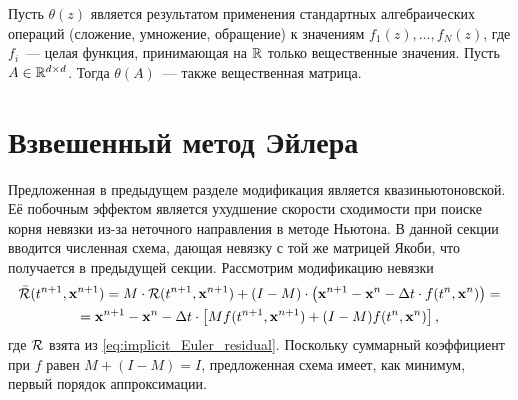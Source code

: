 \begin{corollary}
    \label{cor:real_matrix}
    Пусть $ \theta(z) $ является результатом применения стандартных алгебраических операций (сложение, умножение, обращение)
    к значениям $ f_1(z), \ldots, f_N(z) $, где $ f_i $~--- целая функция, принимающая на $ \mathbb{R} $ только вещественные значения.
    Пусть $ A \in \mathbb{R}^{d \times d} $.
    Тогда $ \theta(A) $~--- также вещественная матрица.
\end{corollary}



\section{Взвешенный метод Эйлера}
\label{sec:weighted_Euler}

Предложенная в предыдущем разделе модификация является квазиньютоновской.
Её побочным эффектом является ухудшение скорости сходимости при поиске корня невязки из-за неточного направления в методе Ньютона.
В данной секции вводится численная схема, дающая невязку с той же матрицей Якоби,
что получается в предыдущей секции.
Рассмотрим модификацию невязки
%
\begin{multline}
    \label{eq:modified_residual}
    \bar{\mathcal{R}}(t^{n+1}, \mathbf{x}^{n+1}) = M \cdot \mathcal{R}(t^{n+1}, \mathbf{x}^{n+1}) + (I - M) \cdot \left( \mathbf{x}^{n+1} - \mathbf{x}^n - \Delta t \cdot f(t^n, \mathbf{x}^n) \right) = \\
    = \mathbf{x}^{n+1} - \mathbf{x}^n - \Delta t \cdot \left[ M f(t^{n+1}, \mathbf{x}^{n+1}) + (I - M) f(t^n, \mathbf{x}^n) \right],
\end{multline}
%
где $ \mathcal{R} $ взята из \eqref{eq:implicit_Euler_residual}.
Поскольку суммарный коэффициент при $ f $ равен $ M + (I - M) = I $,
предложенная схема имеет, как минимум, первый порядок аппроксимации.

